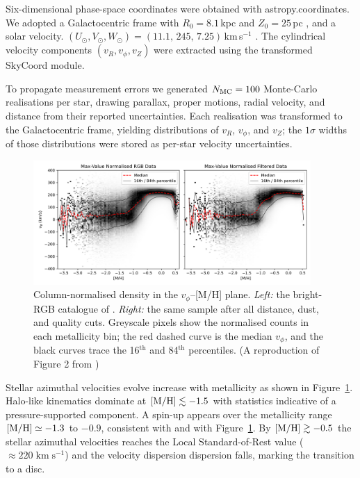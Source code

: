 \documentclass[a4paper,12pt]{article}
\begin{document}
Six-dimensional phase-space coordinates were obtained with
astropy.coordinates.  We adopted a Galactocentric frame
with $R_{0}=8.1$\,kpc and $Z_{0}=25$\,pc \citep{McMillan2016}, and a solar
velocity. $(U_{\odot},V_{\odot},W_{\odot})=(11.1,\,245,\,7.25)$\,km\,s$^{-1}$
\citep{Schonrich2010}.
The cylindrical velocity components
$(v_{R},v_{\phi},v_{Z})$ were extracted using the transformed
SkyCoord module.

To propagate measurement errors we generated
$N_{\rm MC}=100$ Monte-Carlo realisations per star, drawing
parallax, proper motions, radial velocity, and distance from their
reported uncertainties.  Each realisation was transformed to the
Galactocentric frame, yielding distributions of
$v_{R}$, $v_{\phi}$, and $v_{Z}$; the $1\sigma$ widths of those
distributions were stored as per-star velocity uncertainties.


\begin{figure}
  \centering
  \includegraphics[width=0.94\textwidth]{../figures/vphi_histograms_with_tracks.png}
  \caption{Column-normalised density in the $v_{\phi}$–[M/H] plane.
           \textit{Left:} the bright-RGB catalogue of \citet{Andrae2023}.
           \textit{Right:} the same sample after all distance,
           dust, and quality cuts.  Greyscale pixels show the normalised
           counts in each metallicity bin; the red dashed curve is the
           median $v_{\phi}$, and the black curves trace the 16$^{\text{th}}$
           and 84$^{\text{th}}$ percentiles.
           (A reproduction of Figure 2 from \citet{zhang2024existencemetalpoordiscmilky})}
  \label{fig:vphi_tracks}
\end{figure}



Stellar azimuthal velocities
evolve increase with metallicity as shown in Figure~\ref{fig:vphi_tracks}.  
Halo-like kinematics dominate at
${\rm [M/H]}\lesssim-1.5$ with statistics
indicative of a pressure-supported component.  A spin-up appears over the 
metallicity range ${\rm [M/H]} \simeq -1.3$ to $-0.9$, consistent with \citet{Belokurov2022} and with Figure~\ref{fig:vphi_tracks}.
By ${\rm [M/H]}\gtrsim-0.5$ the stellar azimuthal velocities reaches the Local
Standard-of-Rest value ($\approx220\;\mathrm{km\;s^{-1}}$) and the
velocity dispersion dispersion falls, marking the
transition to a disc.  
\end{document}
